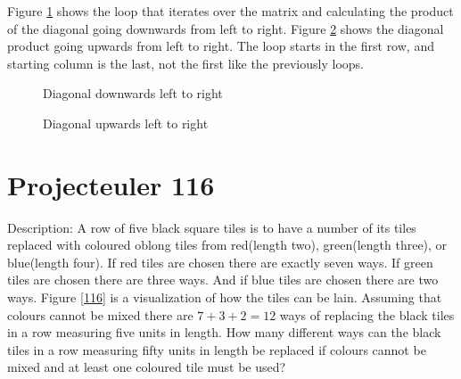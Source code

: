 \documentclass[a4paper,11pt]{article}
\begin{document}
Figure \ref{112} shows the loop that iterates over the matrix and calculating the product of the diagonal going downwards from left to right. Figure \ref{113} shows the diagonal product going upwards from left to right. The loop starts in the first row, and starting column is the last, not the first like the previously loops.
\begin{figure}[H]
	\begin{center}
		
		\caption{Diagonal downwards left to right}
		\label{112}
	\end{center}
\end{figure}
\begin{figure}[H]
	\begin{center}
		
		\caption{Diagonal upwards left to right}
		\label{113}
	\end{center}
\end{figure}

\section{Projecteuler 116}
Description: A row of five black square tiles is to have a number of its tiles replaced with coloured oblong tiles from red(length two), green(length three), or blue(length four). If red tiles are chosen there are exactly seven ways. If green tiles are chosen there are three ways. And if blue tiles are chosen there are two ways. Figure \ref{116} is a visualization of how the tiles can be lain. Assuming that colours cannot be mixed there are $7+3+2=12$ ways of replacing the black tiles in a row measuring five units in length. How many different ways can the black tiles in a row measuring fifty units in length be replaced if colours cannot be mixed and at least one coloured tile must be used?
\end{document}
